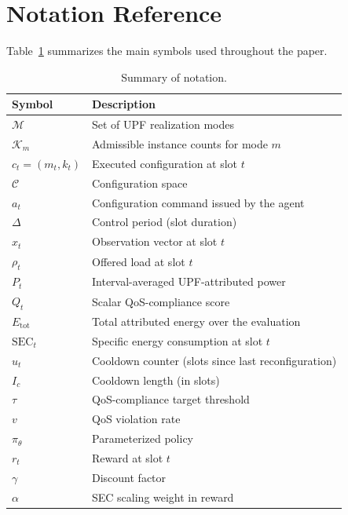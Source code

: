 \documentclass[a4paper,fleqn]{cas-sc}
\begin{document}

\appendix
\section{Notation Reference}
\label{app:notation}

Table~\ref{tab:notation} summarizes the main symbols used throughout the paper.

\begin{table}[width=.9\linewidth,cols=2,pos=h]
\centering
\caption{Summary of notation.}
\label{tab:notation}
\small
\begin{tabular}{l l}
\hline
Symbol & Description \\
\hline
$\mathcal{M}$ & Set of UPF realization modes \\
$\mathcal{K}_m$ & Admissible instance counts for mode $m$ \\
$c_t=(m_t,k_t)$ & Executed configuration at slot $t$ \\
$\mathcal{C}$ & Configuration space \\
$a_t$ & Configuration command issued by the agent \\
$\Delta$ & Control period (slot duration) \\
$x_t$ & Observation vector at slot $t$ \\
$\rho_t$ & Offered load at slot $t$ \\
$P_t$ & Interval-averaged UPF-attributed power \\
$Q_t$ & Scalar QoS-compliance score \\
$E_{\mathrm{tot}}$ & Total attributed energy over the evaluation \\
$\mathrm{SEC}_t$ & Specific energy consumption at slot $t$ \\
$u_t$ & Cooldown counter (slots since last reconfiguration) \\
$I_c$ & Cooldown length (in slots) \\
$\tau$ & QoS-compliance target threshold \\
$v$ & QoS violation rate \\
$\pi_\theta$ & Parameterized policy \\
$r_t$ & Reward at slot $t$ \\
$\gamma$ & Discount factor \\
$\alpha$ & SEC scaling weight in reward \\

\end{tabular}
\end{table}
\end{document}
